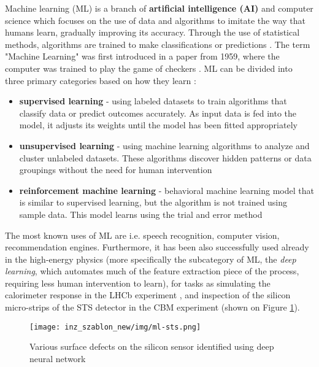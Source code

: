 \pagestyle{fancy}
Machine learning (ML) is a branch of \textbf{artificial intelligence (AI)} and computer science which focuses on the use of data and algorithms to imitate the way that humans learn, gradually improving its accuracy. Through the use of statistical methods, algorithms are trained to make classifications or predictions \cite{ibm}. The term "Machine Learning" was first introduced in a paper from 1959, where the computer was trained to play the game of checkers \cite{ml0}. ML can be divided into three primary categories based on how they learn \cite{ibm}:
\begin{itemize}\thispagestyle{fancy}
    \item \textbf{supervised learning} - using labeled datasets to train algorithms that classify data or predict outcomes accurately. As input data is fed into the model, it adjusts its weights until the model has been fitted appropriately
    \item \textbf{unsupervised learning} - using machine learning algorithms to analyze and cluster unlabeled datasets. These algorithms discover hidden patterns or data groupings without the need for human intervention
    \item \textbf{reinforcement machine learning} -  behavioral machine learning model that is similar to supervised learning, but the algorithm is not trained using sample data. This model learns using the trial and error method
    \end{itemize}
The most known uses of ML are i.e. speech recognition, computer vision, recommendation engines. Furthermore, it has been also successfully used already in the high-energy physics (more specifically the subcategory of ML, the \emph{deep learning}, which automates much of the feature extraction piece of the process, requiring less human intervention to learn), for tasks as simulating the calorimeter response in the LHCb experiment \cite{lhcb}, and inspection of the silicon micro-strips of the STS detector in the CBM experiment \cite{zenia} (shown on Figure \ref{zenia ml}).
\begin{figure}[H]
    \centering
    \texttt{[image: inz\_szablon\_new/img/ml-sts.png]}
    \caption{Various surface defects on the silicon sensor identified using deep neural network \cite{zenia}}
    \label{zenia ml}
\end{figure}


